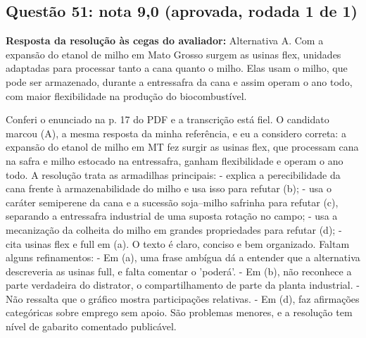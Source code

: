 \documentclass{article}%
\begin{document}
\subsection*{Questão 51: nota 9,0 (aprovada, rodada 1 de 1)}%
\textbf{Resposta da resolução às cegas do avaliador:} Alternativa A. Com a expansão do etanol de milho em Mato Grosso surgem as usinas flex, unidades adaptadas para processar tanto a cana quanto o milho. Elas usam o milho, que pode ser armazenado, durante a entressafra da cana e assim operam o ano todo, com maior flexibilidade na produção do biocombustível.\par %
Conferi o enunciado na p. 17 do PDF e a transcrição está fiel. O candidato marcou (A), a mesma resposta da minha referência, e eu a considero correta: a expansão do etanol de milho em MT fez surgir as usinas flex, que processam cana na safra e milho estocado na entressafra, ganham flexibilidade e operam o ano todo.\newline%
\newline%
A resolução trata as armadilhas principais:\newline%
{-} explica a perecibilidade da cana frente à armazenabilidade do milho e usa isso para refutar (b);\newline%
{-} usa o caráter semiperene da cana e a sucessão soja--milho safrinha para refutar (c), separando a entressafra industrial de uma suposta rotação no campo;\newline%
{-} usa a mecanização da colheita do milho em grandes propriedades para refutar (d);\newline%
{-} cita usinas flex e full em (a).\newline%
\newline%
O texto é claro, conciso e bem organizado. Faltam alguns refinamentos:\newline%
{-} Em (a), uma frase ambígua dá a entender que a alternativa descreveria as usinas full, e falta comentar o 'poderá'.\newline%
{-} Em (b), não reconhece a parte verdadeira do distrator, o compartilhamento de parte da planta industrial.\newline%
{-} Não ressalta que o gráfico mostra participações relativas.\newline%
{-} Em (d), faz afirmações categóricas sobre emprego sem apoio.\newline%
\newline%
São problemas menores, e a resolução tem nível de gabarito comentado publicável.%
\end{document}
